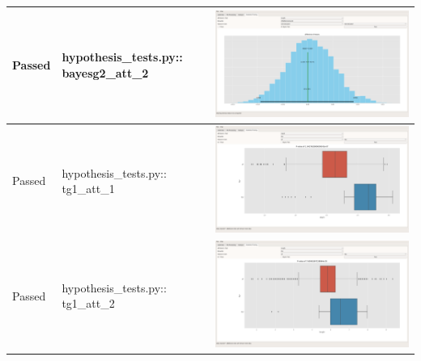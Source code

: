 \documentclass[11pt]{report}
\begin{document}
\begin{longtable}{|l|p{6.5cm}|C|}
\color{ForestGreen}Passed & hypothesis\_tests.py:: bayesg2\_att\_2 & \includegraphics[width=.9\linewidth]{./images/Screenshots/hypothesis_bayestest_g2_att_2.png}\\
\hline
\color{ForestGreen}Passed & hypothesis\_tests.py:: tg1\_att\_1 & \includegraphics[width=.9\linewidth]{./images/Screenshots/hypothesis_ttest_g1_att_1.png}\\
\hline
\color{ForestGreen}Passed & hypothesis\_tests.py:: tg1\_att\_2 & \includegraphics[width=.9\linewidth]{./images/Screenshots/hypothesis_ttest_g1_att_2.png}\\
\hline

\end{longtable}
\end{document}
